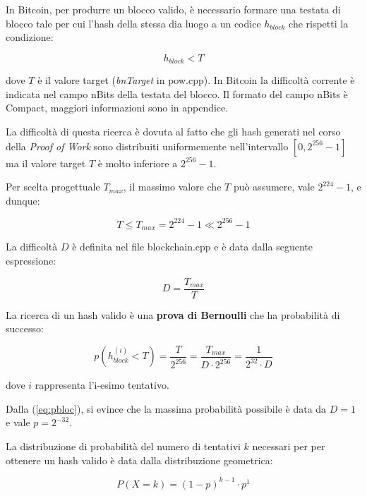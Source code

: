 \documentclass{article}
\begin{document}
In Bitcoin, per produrre un blocco valido, è necessario formare una testata di blocco tale per cui l'hash della stessa dia luogo a un codice $h_{block}$ che rispetti la condizione:

\begin{equation}
    h_{block} < T \label{condizione_hash}
\end{equation}

dove $T$ è il valore target (\textit{bnTarget} in pow.cpp). In Bitcoin la difficoltà corrente è indicata nel campo nBits della testata del blocco.
Il formato del campo nBits è Compact, maggiori informazioni sono in appendice.

La difficoltà di questa ricerca è dovuta al fatto che gli hash generati nel corso della \textit{Proof of Work} sono distribuiti uniformemente nell'intervallo $ \left [0, 2^{256} - 1 \right ]$ ma il valore target $T$ è molto inferiore a $2^{256} - 1$. 

Per scelta progettuale $T_{max}$, il massimo valore che $T$ può assumere, vale $2^{224} - 1$, e dunque:

\begin{equation}
    T \le T_{max} = 2^{224} - 1 \ll 2^{256} - 1 \label{target_value}
\end{equation}

La difficoltà $D$ è definita nel file blockchain.cpp e è data dalla seguente espressione:

\begin{equation}
    D = \frac{T_{max}}{T} \label{diff}
\end{equation}

La ricerca di un hash valido è una \textbf{prova di Bernoulli} che ha probabilità di successo:

\begin{equation}
    \label{eq:pbloc}
    p(h_{block}^{(i)} < T) = \frac{T}{2^{256}} =\frac{T_{max}}{D \cdot 2^{256}} = \frac{1}{2^{32} \cdot D}
\end{equation}

dove $i$ rappresenta l'i-esimo tentativo.

Dalla (\ref{eq:pbloc}), si evince che la massima probabilità possibile è data da $D = 1$ e vale $p = 2^{-32}$.

La distribuzione di probabilità del numero di tentativi $k$ necessari per per ottenere un hash valido è data dalla distribuzione geometrica:

\begin{equation}
    P(X = k) = (1 - p)^{k-1} \cdot p^{1} \label{distribuzione_geometrica}
\end{equation}
\end{document}

